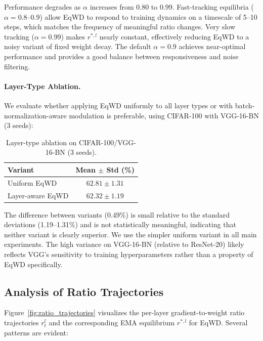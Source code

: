 \documentclass{article}
\begin{document}
Performance degrades as $\alpha$ increases from 0.80 to 0.99.
Fast-tracking equilibria ($\alpha = 0.8$--$0.9$) allow EqWD to
respond to training dynamics on a timescale of 5--10 steps, which
matches the frequency of meaningful ratio changes. Very slow tracking
($\alpha = 0.99$) makes $r^{*,l}$ nearly constant, effectively
reducing EqWD to a noisy variant of fixed weight decay. The default
$\alpha = 0.9$ achieves near-optimal performance and provides a good
balance between responsiveness and noise filtering.

\paragraph{Layer-Type Ablation.}
We evaluate whether applying EqWD uniformly to all layer types or with
batch-normalization-aware modulation is preferable, using CIFAR-100 with
VGG-16-BN (3 seeds):

\begin{table}[t]
\centering
\caption{Layer-type ablation on CIFAR-100/VGG-16-BN (3 seeds).}
\label{tab:ablation_layertype}
\small
\begin{tabular}{lc}
\toprule
Variant & Mean $\pm$ Std (\%) \\
\midrule
Uniform EqWD & $62.81 \pm 1.31$ \\
Layer-aware EqWD & $62.32 \pm 1.19$ \\
\bottomrule
\end{tabular}
\end{table}

The difference between variants (0.49\%) is small relative to the
standard deviations (1.19--1.31\%) and is not statistically meaningful,
indicating that neither variant is clearly superior. We use the simpler
uniform variant in all main experiments. The high variance on VGG-16-BN
(relative to ResNet-20) likely reflects VGG's sensitivity to training
hyperparameters rather than a property of EqWD specifically.


\subsection{Analysis of Ratio Trajectories}
\label{sec:ratio_analysis}

Figure~\ref{fig:ratio_trajectories} visualizes the
per-layer gradient-to-weight ratio trajectories $r_t^l$ and the
corresponding EMA equilibrium $r^{*,l}$ for EqWD. Several patterns are evident:
\end{document}
